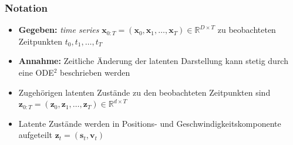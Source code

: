 \begin{frame}
    \frametitle{Notation}
    \begin{itemize}
    	\item \textbf{Gegeben:} \emph{time series} $\mathbf{x}_{0:T}=(\mathbf x_{0}, \mathbf x_{1}, \ldots,\mathbf x_{T})\in \mathbb{R}^{D\times T}$ zu beobachteten Zeitpunkten $t_{0}, t_{1},\ldots,t_{T}$\\
    	\item \textbf{Annahme:} Zeitliche Änderung der latenten Darstellung kann stetig durch eine ODE$^{2}$ beschrieben werden\\
    	\item Zugehörigen latenten Zustände zu den beobachteten Zeitpunkten sind $\mathbf z_{0:T}=(\mathbf z_{0}, \mathbf z_{1}, \ldots, \mathbf z_{T})\in \mathbb{R}^{d\times T}$\\ 
    	\item Latente Zustände werden in Positions- und Geschwindigkeitskomponente aufgeteilt $\mathbf z_{t}=(\mathbf s_{t}, \mathbf v_{t})$
    \end{itemize}
\end{frame}




